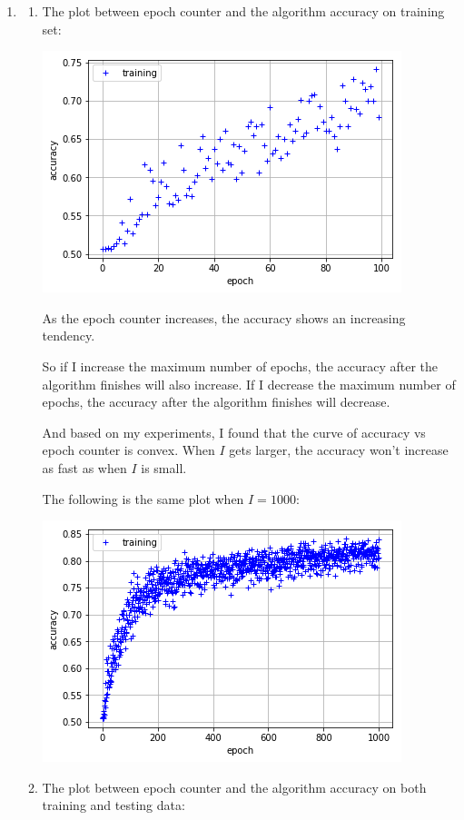 \documentclass[paper=letter, fontsize=12pt]{article}
\begin{document}
\begin{enumerate}
\item 
\begin{enumerate}
	\item 
	The plot between epoch counter and the algorithm accuracy on training set:
	
	\includegraphics[scale=0.5]{p2q1a.png}
	
	As the epoch counter increases, the accuracy shows an increasing tendency.
	
	So if I increase the maximum number of epochs, the accuracy after the algorithm finishes will also increase. If I decrease the maximum number of epochs, the accuracy after the algorithm finishes will decrease.
	
	And based on my experiments, I found that the curve of accuracy vs epoch counter is convex. When $I$ gets larger, the accuracy won't increase as fast as when $I$ is small.
	
	The following is the same plot when $I = 1000$:
	
	\includegraphics[scale=0.5]{p2q1a2.png}
	
	\item 
	The plot between epoch counter and the algorithm accuracy on both training and testing data:
	

\end{enumerate}
\end{enumerate}
\end{document}
